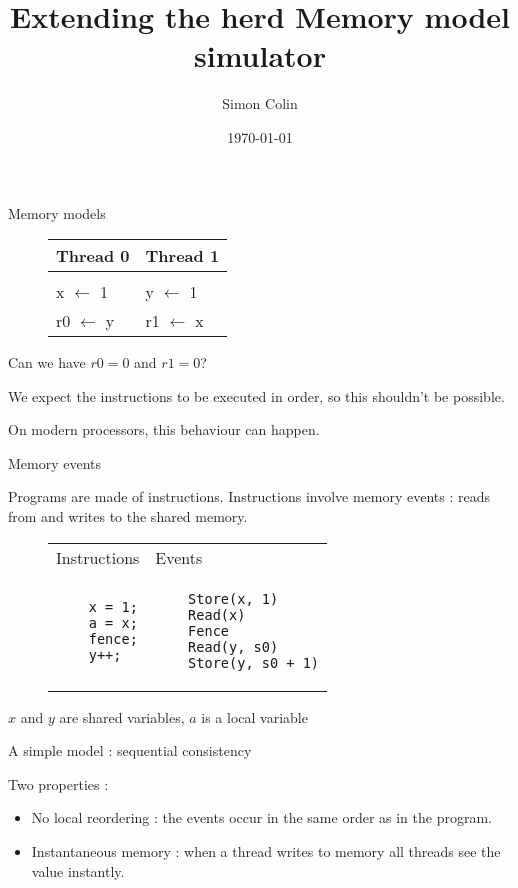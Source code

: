 \documentclass[dvipsnames,svgnames,beamer, 12pt]{beamer}
\title{Extending the herd Memory model simulator}
\author{Simon Colin}
\date{\today}
\begin{document}
\begin{frame}
	\titlepage
\end{frame}


\begin{frame}[fragile]{Memory models}

	\begin{figure}
	\centering
	\begin{tabular}{p{4cm} || p{4cm}}
	Thread 0 & Thread 1 \\
	\hline \\
	x $\leftarrow$ 1 & y $\leftarrow$ 1 \\
	r0 $\leftarrow$ y & r1 $\leftarrow$ x 
	\end{tabular}
	\end{figure}
	\vfill
	Can we have $r0 = 0$ and $r1 = 0$?
	
	We expect the instructions to be executed in order, so this shouldn't be possible.
	
	On modern processors, this behaviour can happen.

\end{frame}

\begin{frame}[fragile]{Memory events}

	Programs are made of instructions.
	\vfill 
	Instructions involve memory events : reads from and writes to the shared memory.
	\vfill
	\begin{figure}
	\centering
	\begin{tabular}{p{4cm} p{4cm}}
	Instructions & Events \\
	\begin{verbatim}
	x = 1;
	a = x;
	fence;
	y++;
	\end{verbatim} &
	\begin{verbatim}
	Store(x, 1)
	Read(x)
	Fence
	Read(y, s0)
	Store(y, s0 + 1)
	\end{verbatim} \\
	\end{tabular}
	\end{figure}
	$x$ and $y$ are shared variables, $a$ is a local variable
	\vfill

\end{frame}

\begin{frame}{A simple model : sequential consistency}

	Two properties :
	\begin{itemize}
	\item No local reordering : the events occur in the same order as in the program.
	\item Instantaneous memory : when a thread writes to memory all threads see the value instantly.
	\end{itemize}

\end{frame}
\end{document}
